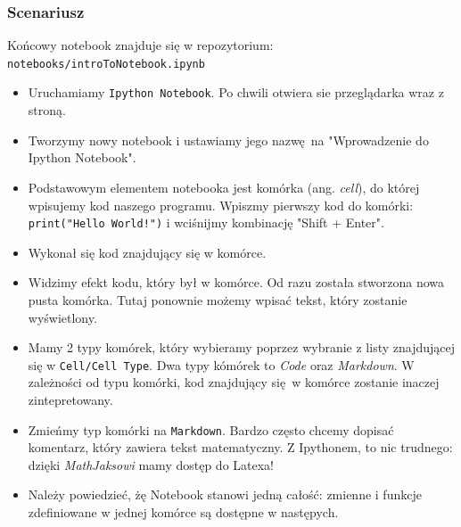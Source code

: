 \documentclass{mwart}
\begin{document}
\subsubsection{Scenariusz}
Końcowy notebook znajduje się w repozytorium: \texttt{notebooks/introToNotebook.ipynb}
\begin{itemize}
  \item Uruchamiamy \texttt{Ipython Notebook}. Po chwili otwiera sie przeglądarka wraz z
    stroną.
  \item Tworzymy nowy notebook i ustawiamy jego nazwę na "Wprowadzenie do Ipython
    Notebook".
  \item Podstawowym elementem notebooka jest komórka (ang. \emph{cell}), do której
    wpisujemy kod naszego programu. Wpiszmy pierwszy kod do komórki:
    \texttt{print("Hello World!")} i wciśnijmy kombinację "Shift + Enter".
  \item Wykonał się kod znajdujący się w komórce.
  \item Widzimy efekt kodu, który był w komórce. Od razu została stworzona nowa pusta
    komórka. Tutaj ponownie możemy wpisać tekst, który zostanie wyświetlony.
  \item Mamy 2 typy komórek, który wybieramy poprzez wybranie z listy znajdującej się w
    \texttt{Cell/Cell Type}. Dwa typy kómórek to \emph{Code} oraz \emph{Markdown}. W
    zależności od typu komórki, kod znajdujący się w komórce zostanie inaczej
    zintepretowany.
  \item Zmieńmy typ komórki na \texttt{Markdown}. Bardzo często chcemy dopisać
    komentarz, który zawiera tekst matematyczny. Z Ipythonem, to nic trudnego: dzięki
    \emph{MathJaksowi} mamy dostęp do Latexa!
  \item Należy powiedzieć, żę Notebook stanowi jedną całość: zmienne i funkcje
    zdefiniowane w jednej komórce są dostępne w następych.
\end{itemize}
\end{document}
